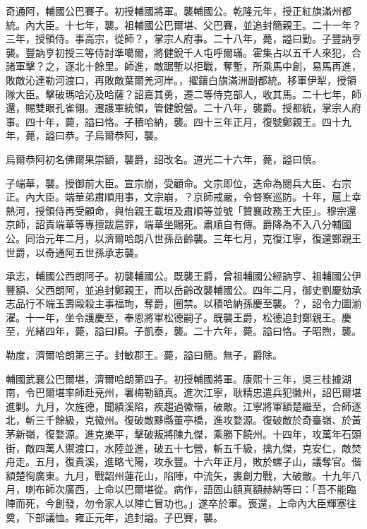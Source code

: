 \begin{pinyinscope}
奇通阿，輔國公巴賽子。初授輔國將軍。襲輔國公。乾隆元年，授正紅旗滿州都統。內大臣。十七年，襲。祖輔國公巴爾堪、父巴賽，並追封簡親王。二十一年？三年，授領侍。事高宗，從師？，掌宗人府事。二十八年，薨，謚曰勤。子豐訥亨襲。豐訥亨初授三等侍討準噶爾，將健銳千人屯呼爾璊。霍集占以五千人來犯，合諸軍擊？之，逐北十餘里。師進，敵踞塹以拒戰，奪塹，所乘馬中創，易馬再進，敗敵沁達勒河渡口，再敗敵葉爾羌河岸。，擢鑲白旗滿洲副都統。移軍伊犁，授領隊大臣。擊破瑪哈沁及哈薩？詔嘉其勇，遷二等侍克部人，收其馬。二十七年，師還，賜雙眼孔雀翎。遷護軍統領，管健銳營。二十八年，襲爵。授都統，掌宗人府事。四十年，薨，謚曰恪。子積哈納，襲。四十三年正月，復號鄭親王。四十九年，薨，謚曰恭。子烏爾恭阿，襲。

烏爾恭阿初名佛爾果崇額，襲爵，詔改名。道光二十六年，薨，謚曰慎。

子端華，襲。授御前大臣。宣宗崩，受顧命。文宗即位，迭命為閱兵大臣、右宗正。內大臣。端華弟肅順用事，文宗崩，？京師戒嚴，令督察巡防。十年，扈上幸熱河，授領侍再受顧命，與怡親王載垣及肅順等並號「贊襄政務王大臣」。穆宗還京師，詔責端華等專擅跋扈罪，端華坐賜死。肅順自有傳。爵降為不入八分輔國公。同治元年二月，以濟爾哈朗八世孫岳齡襲。三年七月，克復江寧，復還鄭親王世爵，以奇通阿五世孫承志襲。

承志，輔國公西朗阿子。初襲輔國公。既襲王爵，曾祖輔國公經訥亨、祖輔國公伊豐額、父西朗阿，並追封鄭親王，而以岳齡改襲輔國公。四年二月，御史劉慶劾承志品行不端玉壽毆殺主事福珣，奪爵，圈禁。以積哈納孫慶至襲。？，詔令力圖湔濯。十一年，坐令護慶至，奉恩將軍松德嗣子。既襲王爵，松德追封鄭親王。慶至，光緒四年，薨，謚曰順。子凱泰，襲。二十六年，薨。謚曰恪。子昭煦，襲。

勒度，濟爾哈朗第三子。封敏郡王。薨，謚曰簡。無子，爵除。

輔國武襄公巴爾堪，濟爾哈朗第四子。初授輔國將軍。康熙十三年，吳三桂據湖南，令巴爾堪率師赴兗州，署梅勒額真。進次江寧，耿精忠遣兵犯徽州，詔巴爾堪進剿。九月，次旌德，聞績溪陷，疾趨過徽嶺，破敵。江寧將軍額楚繼至，合師逐北，斬三千餘級，克徽州。復破敵黟縣董亭橋，進攻婺源。復破敵於奇臺嶺、於黃茅新嶺，復婺源。進克樂平，擊破叛將陳九傑，乘勝下饒州。十四年，攻萬年石頭街，敵四萬人禦渡口，水陸並進，破五十七營，斬五千級，擒九傑，克安仁，敵焚舟走。五月，復貴溪，進略弋陽，攻永豐。十六年正月，敗於螺子山，議奪官。偕額楚徇廣東。九月，戰韶州蓮花山，陷陣，中流矢，裹創力戰，大破敵。十九年八月，喇布師次廣西，上命以巴爾堪從。病作，語固山額真額赫納等曰：「吾不能臨陣而死，今創發，勿令家人以陣亡冒功也。」遂卒於軍。喪還，上命內大臣輝塞往奠，下部議恤。雍正元年，追封謚。子巴賽，襲。


\end{pinyinscope}
